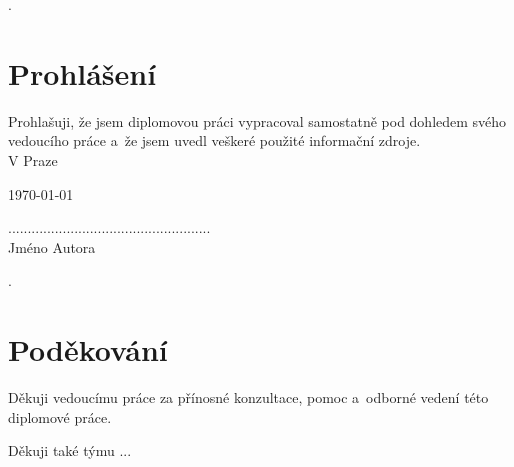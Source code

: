 .\newpage
\thispagestyle{empty}
\chapter*{Prohlášení}
\noindent Prohlašuji, že jsem diplomovou práci vypracoval samostatně pod dohledem své\-ho ve\-dou\-cí\-ho
práce a~že jsem uvedl veškeré použité informační zdroje.\\

\noindent V Praze

\noindent \today \\

\begin{flushright}

....................................................\\
Jméno Autora
\end{flushright}

.\newpage 
\thispagestyle{empty}
\chapter*{Poděkování}
\noindent Děkuji vedoucímu práce za přínosné konzultace, pomoc a~odborné vedení této diplomové práce.

\noindent Děkuji také týmu ...
\newpage 
\thispagestyle{empty}